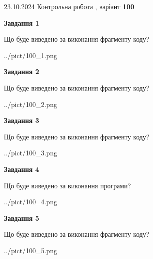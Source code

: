 \documentclass[12pt, ukrainian]{article}
\begin{document}
{\Large{23.10.2024 Контрольна робота , варіант  \No \textbf { 100 }\par}}
{
\begin {large}
{\begin {center}\textbf{Завдання 1}\end {center}}

Що буде виведено за виконання фрагменту коду?\par
\begin{center}
	{../pict/100_1.png}
\end{center}
\newpage

{\begin {center}\textbf{Завдання 2}\end {center}}

Що буде виведено за виконання фрагменту коду?\par
\begin{center}
	{../pict/100_2.png}
\end{center}
\newpage

{\begin {center}\textbf{Завдання 3}\end {center}}

Що буде виведено за виконання фрагменту коду?\par
\begin{center}
	{../pict/100_3.png}
\end{center}
\newpage

{\begin {center}\textbf{Завдання 4}\end {center}}

Що буде виведено за виконання програми?\par
\begin{center}
	{../pict/100_4.png}
\end{center}
\newpage

{\begin {center}\textbf{Завдання 5}\end {center}}

Що буде виведено за виконання фрагменту коду?\par
\begin{center}
	{../pict/100_5.png}
\end{center}
\newpage


\end{large}}
\end{document}
